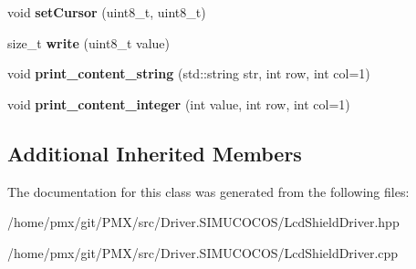 \begin{DoxyCompactItemize}
\mbox{\label{classLcdShieldDriver_a6733a16dc0e1d58cfdfb4019ea2e6582}} 
void {\bfseries set\+Cursor} (uint8\+\_\+t, uint8\+\_\+t)
\item 
\mbox{\label{classLcdShieldDriver_aea03f93f7dfad9bc185bd77ef059c665}} 
size\+\_\+t {\bfseries write} (uint8\+\_\+t value)
\item 
\mbox{\label{classLcdShieldDriver_a893f217db662b34726d0684bb014f7d4}} 
void {\bfseries print\+\_\+content\+\_\+string} (std\+::string str, int row, int col=1)
\item 
\mbox{\label{classLcdShieldDriver_ae1a249341c06d6992767e8176ef96056}} 
void {\bfseries print\+\_\+content\+\_\+integer} (int value, int row, int col=1)
\end{DoxyCompactItemize}
\subsection*{Additional Inherited Members}


The documentation for this class was generated from the following files\+:\begin{DoxyCompactItemize}
\item 
/home/pmx/git/\+P\+M\+X/src/\+Driver.\+S\+I\+M\+U\+C\+O\+C\+O\+S/Lcd\+Shield\+Driver.\+hpp\item 
/home/pmx/git/\+P\+M\+X/src/\+Driver.\+S\+I\+M\+U\+C\+O\+C\+O\+S/Lcd\+Shield\+Driver.\+cpp\end{DoxyCompactItemize}
